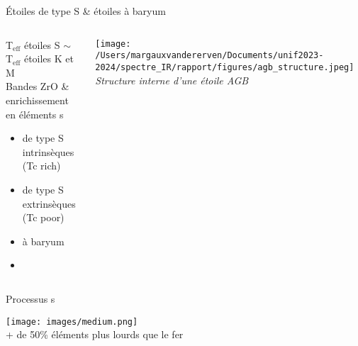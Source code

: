 \documentclass[10pt]{beamer}
\subtitle{Étude de spectres infrarouges de géantes rouges évoluées}
\date{}
\author{\small Margaux Vandererven}
\institute{\small Supervisé par Sophie Van Eck}
\begin{document}
\maketitle


\begin{frame}[fragile]{Étoiles de type S \& étoiles à baryum}

    \begin{columns}
            \begin{column}{0.6\textwidth}
                    T$_{\text{eff}}$ étoiles S $\sim$ T$_{\text{eff}}$ étoiles K et M \\

                    Bandes ZrO \& enrichissement en éléments s \\
    					\begin{itemize}
    						\item de type S intrinsèques (Tc rich)
    						\item de type S extrinsèques (Tc poor)
    						\item à baryum
    						\item[] 
    					\end{itemize} 
            \end{column}
            \begin{column}{0.4\textwidth}
                \centering
                \texttt{[image: /Users/margauxvandererven/Documents/unif2023-2024/spectre\_IR/rapport/figures/agb\_structure.jpeg]}
    			\textit{Structure interne d'une étoile AGB}
            \end{column}
    \end{columns}
\end{frame}

\begin{frame}[fragile]{Processus s}

    \begin{center}
        \texttt{[image: images/medium.png]} \\
        + de 50\% éléments plus lourds que le fer \\
    \end{center}
\end{frame}
\end{document}
